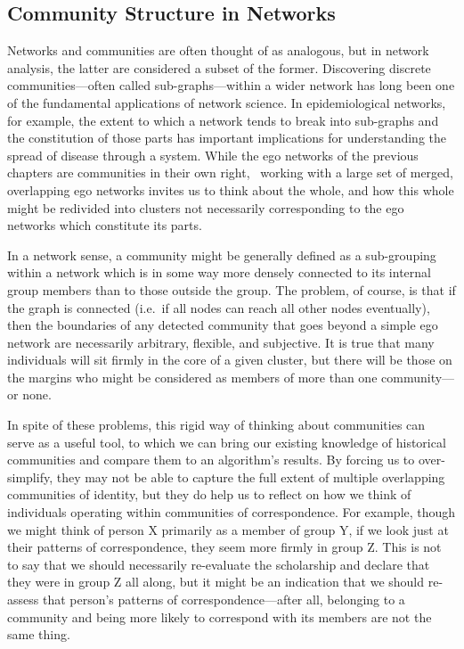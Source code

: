 \documentclass[
]{book}
\begin{document}
\hypertarget{community-structure-in-networks}{%
\subsection{Community Structure in Networks}\label{community-structure-in-networks}}

Networks and communities are often thought of as analogous, but in network analysis, the latter are considered a subset of the former. Discovering discrete communities---often called sub-graphs---within a wider network has long been one of the fundamental applications of network science. In epidemiological networks, for example, the extent to which a network tends to break into sub-graphs and the constitution of those parts has important implications for understanding the spread of disease through a system. While the ego networks of the previous chapters are communities in their own right,~ working with a large set of merged, overlapping ego networks invites us to think about the whole, and how this whole might be redivided into clusters not necessarily corresponding to the ego networks which constitute its parts.

In a network sense, a community might be generally defined as a sub-grouping within a network which is in some way more densely connected to its internal group members than to those outside the group. The problem, of course, is that if the graph is connected (i.e.~if all nodes can reach all other nodes eventually), then the boundaries of any detected community that goes beyond a simple ego network are necessarily arbitrary, flexible, and subjective. It is true that many individuals will sit firmly in the core of a given cluster, but there will be those on the margins who might be considered as members of more than one community---or none.~

In spite of these problems, this rigid way of thinking about communities can serve as a useful tool, to which we can bring our existing knowledge of historical communities and compare them to an algorithm's results. By forcing us to over-simplify, they may not be able to capture the full extent of multiple overlapping communities of identity, but they do help us to reflect on how we think of individuals operating within communities of correspondence. For example, though we might think of person X primarily as a member of group Y, if we look just at their patterns of correspondence, they seem more firmly in group Z. This is not to say that we should necessarily re-evaluate the scholarship and declare that they were in group Z all along, but it might be an indication that we should re-assess that person's patterns of correspondence---after all, belonging to a community and being more likely to correspond with its members are not the same thing.~
\end{document}
